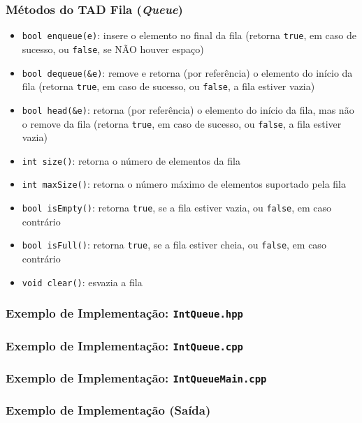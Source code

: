 \documentclass[aspectratio=169]{beamer}
\begin{document}
\begin{frame}\frametitle{Métodos do TAD Fila (\emph{Queue})}
\begin{itemize}
	\item \texttt{bool enqueue(e)}: insere o elemento no final da fila (retorna \texttt{true}, em caso de sucesso, ou \texttt{false}, se NÃO houver espaço)
	\item \texttt{bool dequeue(\&e)}: remove e retorna (por referência) o elemento do início da fila (retorna \texttt{true}, em caso de sucesso, ou \texttt{false}, a fila estiver vazia)
	\item \texttt{bool head(\&e)}: retorna (por referência) o elemento do início da fila, mas não o remove da fila (retorna \texttt{true}, em caso de sucesso, ou \texttt{false}, a fila estiver vazia)
	\item \texttt{int size()}: retorna o número de elementos da fila
	\item \texttt{int maxSize()}: retorna o número máximo de elementos suportado pela fila
	\item \texttt{bool isEmpty()}: retorna \texttt{true}, se a fila estiver vazia, ou \texttt{false}, em caso contrário
	\item \texttt{bool isFull()}: retorna \texttt{true}, se a fila estiver cheia, ou \texttt{false}, em caso contrário
	\item \texttt{void clear()}: esvazia a fila
\end{itemize}
\end{frame}

\begin{frame}\frametitle{Exemplo de Implementação: \texttt{IntQueue.hpp}}

\end{frame}

\begin{frame}\frametitle{Exemplo de Implementação: \texttt{IntQueue.cpp}}
\fontsize{3pt}{5pt}\selectfont{

}
\end{frame}
	
\begin{frame}\frametitle{Exemplo de Implementação: \texttt{IntQueueMain.cpp}}
\fontsize{5pt}{6pt}\selectfont{

}
\end{frame}
\begin{frame}\frametitle{Exemplo de Implementação (Saída)}

\end{frame}
\end{document}
